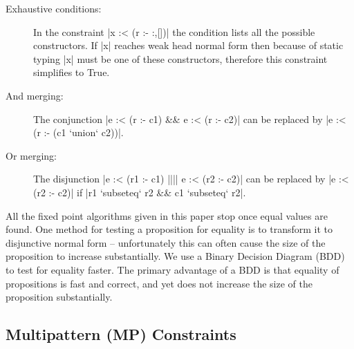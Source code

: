 \documentclass[preprint]{sigplanconf}
\begin{document}
\begin{description}
\item[Exhaustive conditions:] In the constraint |x :< (r :- {:,[]})| the condition lists all the possible constructors. If |x| reaches weak head normal form then because of static typing |x| must be one of these constructors, therefore this constraint simplifies to True.

\item[And merging:] The conjunction |e :< (r :- c1) && e :< (r :- c2)| can be replaced by |e :< (r :- (c1 `union` c2))|.

\item[Or merging:] The disjunction |e :< (r1 :- c1) |||| e :< (r2 :- c2)| can be replaced by |e :< (r2 :- c2)| if |r1 `subseteq` r2 && c1 `subseteq` r2|.
\end{description}

All the fixed point algorithms given in this paper stop once equal values are found. One method for testing a proposition for equality is to transform it to disjunctive normal form -- unfortunately this can often cause the size of the proposition to increase substantially. We use a Binary Decision Diagram (BDD) \citep{lee:bdd} to test for equality faster. The primary advantage of a BDD is that equality of propositions is fast and correct, and yet does not increase the size of the proposition substantially.

\subsection{Multipattern (MP) Constraints}
\label{sec:multipattern}
\end{document}
